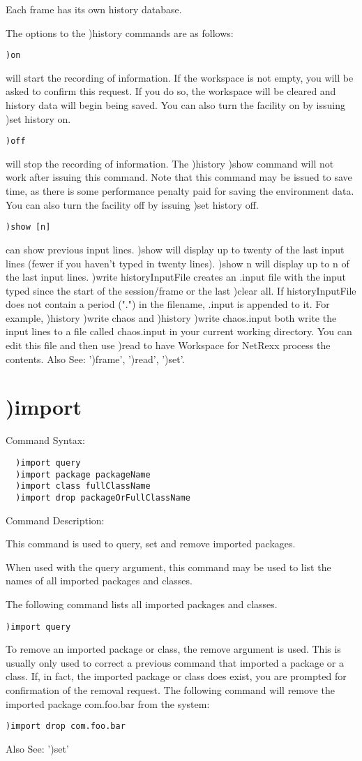 Each frame has its own history database.

The options to the )history commands are as follows:
\begin{verbatim}
)on
\end{verbatim}
will start the recording of information. If the workspace is not empty, you will be asked to confirm this request. If you do so, the workspace will be cleared and history data will begin being saved. You can also turn the facility on by issuing )set history on.
\begin{verbatim}
)off
\end{verbatim}
will stop the recording of information. The )history )show command will not work after issuing this command. Note that this command may be issued to save time, as there is some performance penalty paid for saving the environment data. You can also turn the facility off by issuing )set history off.
\begin{verbatim}
)show [n]
\end{verbatim}
can show previous input lines. )show will display up to twenty of the last input lines (fewer if you haven't typed in twenty lines). )show n will display up to n of the last input lines.
)write historyInputFile
creates an .input file with the input typed since the start of the session/frame or the last )clear all. If historyInputFile does not contain a period (".") in the filename, .input is appended to it. For example, )history )write chaos and )history )write chaos.input both write the input lines to a file called chaos.input in your current working directory. You can edit this file and then use )read to have Workspace for NetRexx process the contents.
Also See: ')frame', ')read', ')set'.

\section{)import}

Command Syntax:
\begin{verbatim}
  )import query
  )import package packageName
  )import class fullClassName
  )import drop packageOrFullClassName
\end{verbatim}
Command Description:

This command is used to query, set and remove imported packages.

When used with the query argument, this command may be used to list the names of all imported packages and classes.

The following command lists all imported packages and classes.
\begin{verbatim}
)import query
\end{verbatim}
To remove an imported package or class, the remove argument is used. This is usually only used to correct a previous command that imported a package or a class. If, in fact, the imported package or class does exist, you are prompted for confirmation of the removal request. The following command will remove the imported package com.foo.bar from the system:
\begin{verbatim}
)import drop com.foo.bar
\end{verbatim}
Also See: ')set'

